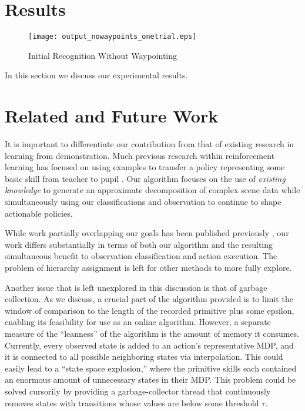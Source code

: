 \documentclass[letterpaper]{article}
\begin{document}
\section{Results}
\label{sec:result}

\begin{figure}
\begin{center}
\texttt{[image: output\_nowaypoints\_onetrial.eps]}
\caption{Initial Recognition Without Waypointing}
\label{fig:output_nowaypoints_onetrial}
\end{center}
\end{figure}

In this section we discuss our experimental results.

\section{Related and Future Work}
\label{sec:future}
It is important to differentiate our contribution from that of
existing research in learning from demonstration.  Much previous research
within reinforcement learning has focused on using examples to
transfer a policy representing some basic skill from teacher to
pupil \cite{JenkinsLFD,LFDSurvey}.  Our algorithm focuses on the use of
\textit{existing knowledge} to generate an approximate decomposition of
complex scene data while simultaneously using our classifications and 
observation to continue to shape actionable policies.

While work partially overlapping our goals has been published previously
\cite{LearningBehaviorFusion}, our work differs substantially in terms of both
our algorithm and the resulting simultaneous benefit to observation
classification and action execution. The problem of hierarchy assignment is
left for other methods to more fully explore.

Another issue that is left unexplored in this discussion is that of garbage collection.  As we discuss, a crucial part of the algorithm provided is to limit the window of comparison to the length of the recorded primitive plus some epsilon, enabling its feasibility for use as an online algorithm.  However, a separate measure of the ``leanness'' of the algorithm is the amount of memory it consumes.  Currently, every observed state is added to an action's representative MDP, and it is connected to all possible neighboring states via interpolation.  This could easily lead to a ``state space explosion,'' where the primitive skills each contained an enormous amount of unnecessary states in their MDP.  This problem could be solved cursorily by providing a garbage-collector thread that continuously removes states with transitions whose values are below some threshold $\tau$.
\end{document}
